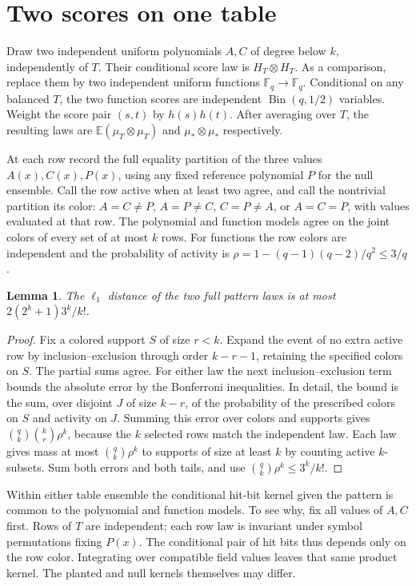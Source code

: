 \documentclass[11pt]{article}
\newtheorem{lemma}[theorem]{Lemma}
\newcommand{\F}{\mathbb F}
\newcommand{\E}{\mathbb E}
\newcommand{\Bin}{\operatorname{Bin}}
\begin{document}
\section{Two scores on one table}
Draw two independent uniform polynomials $A,C$ of degree below $k$, independently of $T$. Their conditional score law is $H_T\otimes H_T$. As a comparison, replace them by two independent uniform functions $\F_q\to\F_q$. Conditional on any balanced $T$, the two function scores are independent $\Bin(q,1/2)$ variables. Weight the score pair $(s,t)$ by $h(s)h(t)$. After averaging over $T$, the resulting laws are $\E(\mu_T\otimes\mu_T)$ and $\mu_*\otimes\mu_*$ respectively.

At each row record the full equality partition of the three values $A(x),C(x),P(x)$, using any fixed reference polynomial $P$ for the null ensemble. Call the row active when at least two agree, and call the nontrivial partition its color: $A=C\ne P$, $A=P\ne C$, $C=P\ne A$, or $A=C=P$, with values evaluated at that row. The polynomial and function models agree on the joint colors of every set of at most $k$ rows. For functions the row colors are independent and the probability of activity is $\rho=1-(q-1)(q-2)/q^2\le3/q$.

\begin{lemma}\label{lem:sift}
The $\ell_1$ distance of the two full pattern laws is at most $2(2^k+1)3^k/k!$.
\end{lemma}
\begin{proof}
Fix a colored support $S$ of size $r<k$. Expand the event of no extra active row by inclusion--exclusion through order $k-r-1$, retaining the specified colors on $S$. The partial sums agree. For either law the next inclusion--exclusion term bounds the absolute error by the Bonferroni inequalities. In detail, the bound is the sum, over disjoint $J$ of size $k-r$, of the probability of the prescribed colors on $S$ and activity on $J$. Summing this error over colors and supports gives $\binom qk\binom kr\rho^k$, because the $k$ selected rows match the independent law. Each law gives mass at most $\binom qk\rho^k$ to supports of size at least $k$ by counting active $k$-subsets. Sum both errors and both tails, and use $\binom qk\rho^k\le3^k/k!$.
\end{proof}

Within either table ensemble the conditional hit-bit kernel given the pattern is common to the polynomial and function models. To see why, fix all values of $A,C$ first. Rows of $T$ are independent; each row law is invariant under symbol permutations fixing $P(x)$. The conditional pair of hit bits thus depends only on the row color. Integrating over compatible field values leaves that same product kernel. The planted and null kernels themselves may differ.
\end{document}

